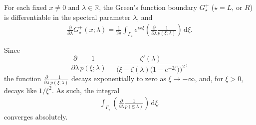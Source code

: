 \documentclass[../dissertation]{subfiles}
\begin{document}
\begin{prop}\label{prop2:ldervG}
	For each fixed $x\ne 0$ and $\lambda \in \mathbb R$, the Green's function 
	boundary $G_\star^+$ ($\star = L \text{, or } R$) is differentiable in 
	the spectral parameter $\lambda$, and 
	\begin{align*}
		\frac{\partial}{\partial \lambda} G_\star^+(x; \lambda)
			= \frac{1}{2\pi} 
				\int_{{\Gamma_\star}} e^{ix\xi} 
					\left(
						\frac{\partial}{\partial \lambda} \frac{1}{p(\xi; \lambda)}
					\right)
				\, \mathrm{d}\xi.
	\end{align*}
\end{prop}
\begin{rmk}
	Since
	\[
		\frac{\partial}{\partial \lambda} \frac{1}{p(\xi; \lambda)}
			= 
				\frac{\zeta'(\lambda)}
				{\Big(\xi - \zeta(\lambda)\big(1-e^{-2\xi}\big)\Big)^2},
	\]
	the function $\frac{\partial}{\partial \lambda} \frac{1}{p(\xi; \lambda)}$ 
	decays exponentially to zero as $\xi\to -\infty$, and, for $\xi > 0$, decays
	like $1/\xi^2$. As such, the integral
	\begin{align*}
		\int_{\Gamma_\star}
			\left(
				\frac{\partial}{\partial \lambda} \frac{1}{p(\xi; \lambda)}
			\right)
		\, \mathrm{d}\xi.
	\end{align*}
	converges absolutely.
\end{rmk}
\end{document}
